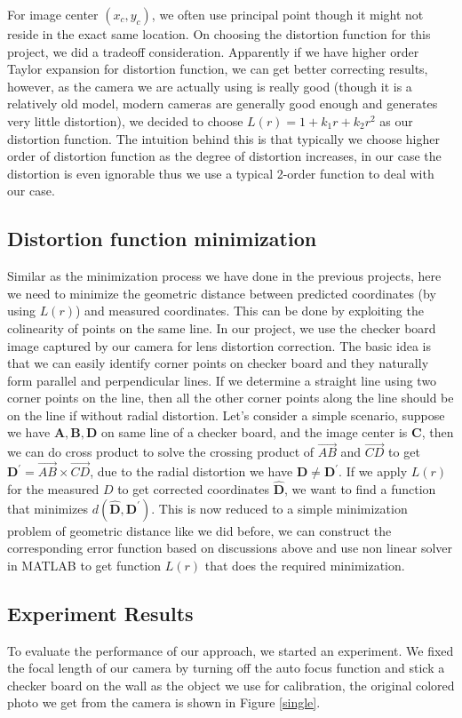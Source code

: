 \documentclass[conference]{IEEEtran}
\let\oldvec\vec
\renewcommand{\vec}[1]{\oldvec{\mathit{#1}}}
\newcommand{\mat}[1]{\mathbf{#1}} %
\begin{document}
For image center $(x_c, y_c)$, we often use principal point though it might not reside in the exact same location. On choosing the distortion function for this project, we did a tradeoff consideration. Apparently if we have higher order Taylor expansion for distortion function, we can get better correcting results, however, as the camera we are actually using is really good (though it is a relatively old model, modern cameras are generally good enough and generates very little distortion), we decided to choose $L(r) = 1 + k_1r + k_2r^2$ as our distortion function.
The intuition behind this is that typically we choose higher order of distortion function as the degree of distortion increases, in our case the distortion is even ignorable thus we use a typical 2-order function to deal with our case.

\subsection{Distortion function minimization}
Similar as the minimization process we have done in the previous projects, here we need to minimize the geometric distance between predicted coordinates (by using $L(r)$) and measured coordinates. This can be done by exploiting the colinearity of points on the same line. In our project, we use the checker board image captured by our camera for lens distortion correction. The basic idea is that we can easily identify corner points on checker board and they naturally form parallel and perpendicular lines. If we determine a straight line using two corner points on the line, then all the other corner points along the line should be on the line if without radial distortion. Let's consider a simple scenario, suppose we have $\mat{A}, \mat{B}, \mat{D}$ on same line of a checker board, and the image center is $\mat{C}$, then we can do cross product to solve the crossing product of $\vec{AB}$ and $\vec{CD}$ to get $\mat{D}^{\prime} = \vec{AB}\times \vec{CD}$, due to the radial distortion we have $\mat{D} \neq \mat{D}^\prime$. If we apply $L(r)$ for the measured $D$ to get corrected coordinates $\hat{\mat{D}}$, we want to find a function that minimizes $d(\hat{\mat{D}}, \mat{D}^\prime)$. This is now reduced to a simple minimization problem of geometric distance like we did before, we can construct the corresponding error function based on discussions above and use non linear solver in MATLAB to get function $L(r)$ that does the required minimization.

\subsection{Experiment Results}
To evaluate the performance of our approach, we started an experiment. We fixed the focal length of our camera by turning off the auto focus function and stick a checker board on the wall as the object we use for calibration, the original colored photo we get from the camera is shown in Figure \ref{single}.
\end{document}
